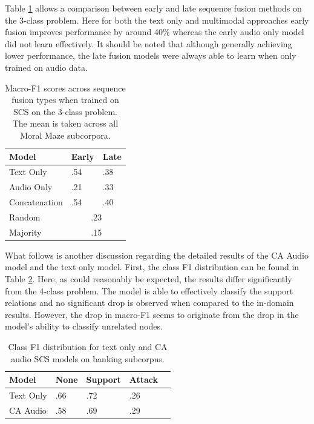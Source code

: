 \documentclass[twocolumn,twoside]{article}
\begin{document}
Table \ref{tbl:results-seq-3class-cd} allows a comparison between early
and late sequence fusion methods on the 3-class problem. Here for both
the text only and multimodal approaches early fusion improves
performance by around 40\% whereas the early audio only model did not
learn effectively. It should be noted that although generally achieving
lower performance, the late fusion models were always able to learn when
only trained on audio data.

\begin{table}[H]
\centering
\caption{Macro-F1 scores across sequence fusion types when trained on SCS on the 3-class problem. The mean is taken across all Moral Maze subcorpora. \label{tbl:results-seq-3class-cd}}
\begin{tabular}{|l|ll|}
\hline
Model         & Early       & Late      \\ \hline
Text Only     & .54         & .38    \\
Audio Only    & .21         & .33    \\
Concatenation & .54         & .40    \\ \hline
Random        & \multicolumn{2}{c|}{.23} \\
Majority      & \multicolumn{2}{c|}{.15} \\ \hline
\end{tabular}
\end{table}

What follows is another discussion regarding the detailed results of the
CA Audio model and the text only model. First, the class F1 distribution
can be found in Table \ref{tbl:class-f1-3class-banking}. Here, as could
reasonably be expected, the results differ significantly from the
4-class problem. The model is able to effectively classify the support
relations and no significant drop is observed when compared to the
in-domain results. However, the drop in macro-F1 seems to originate from
the drop in the model's ability to classify unrelated nodes.

\begin{table}[H]
\centering
\caption{Class F1 distribution for text only and CA audio SCS models on banking subcorpus.\label{tbl:class-f1-3class-banking}}
\begin{tabular}{|l|llll|}
\hline
Model     & None & Support & \multicolumn{1}{l|}{Attack} \\ \hline
Text Only & .66           & .72              & \multicolumn{1}{l|}{.26}         \\
CA Audio  & .58           & .69              & \multicolumn{1}{l|}{.29}         \\ \hline
\end{tabular}
\end{table}
\end{document}
